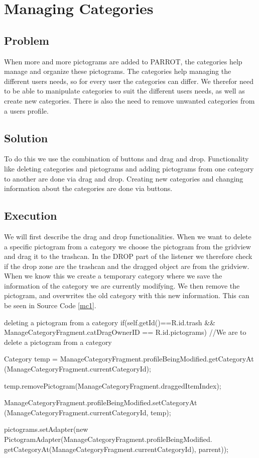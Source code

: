 \section{Managing Categories} %
\label{mc}
\subsection*{Problem}
When more and more pictograms are added to PARROT, the categories help manage and organize these pictograms. 
The categories help managing the different users needs, so for every user the categories can differ. 
We therefor need to be able to manipulate categories to suit the different users needs, as well as create new categories. 
There is also the need to remove unwanted categories from a users profile.


\subsection*{Solution}
To do this we use the combination of buttons and drag and drop. 
Functionality like deleting categories and pictograms and adding pictograms from one category to another are done via drag and drop. 
Creating new categories and changing information about the categories are done via buttons. 


\subsection*{Execution}
We will first describe the drag and drop functionalities. 
When we want to delete a specific pictogram from a category we choose the pictogram from the gridview and drag it to the trashcan. 
In the DROP part of the listener we therefore check if the drop zone are the trashcan and the dragged object are from the gridview.
When we know this we create a temporary category where we save the information of the category we are currently modifying. We then remove the pictogram, and overwrites the old category with this new information.
This can be seen in Source Code \ref{mc1}.

\begin{source}[{mc1}]{deleting a pictogram from a category}
if(self.getId()==R.id.trash && ManageCategoryFragment.catDragOwnerID == R.id.pictograms) //We are to delete a pictogram from a category
				{
					Category temp = ManageCategoryFragment.profileBeingModified.getCategoryAt
						(ManageCategoryFragment.currentCategoryId);
					
					temp.removePictogram(ManageCategoryFragment.draggedItemIndex);
					
					ManageCategoryFragment.profileBeingModified.setCategoryAt
						(ManageCategoryFragment.currentCategoryId, temp);
					
					pictograms.setAdapter(new PictogramAdapter(ManageCategoryFragment.profileBeingModified.
						getCategoryAt(ManageCategoryFragment.currentCategoryId), parrent));
				}
\end{source}

